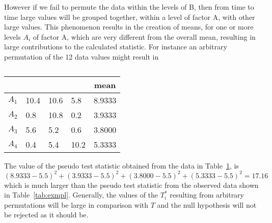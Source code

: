 \documentclass[12pt]{article}
\begin{document}
However if we fail to permute the data within the levels of B,
then from time to time large values will be grouped together, within
a level of factor A, with other large values.  This phenomenon
results in the creation of means, for one or more levels $A_i$ of
factor A, which are very different from the overall mean, resulting
in large contributions to the calculated statistic.  For instance
an arbitrary permutation of the 12 data values might result in
\begin{table}[H]
\caption{\label{tab:arbperm}}
\begin{center}
\begin{tabular}{|l|l|l|l|l|} \hline
\multicolumn{4}{|c}{} & \multicolumn{1}{|c|}{mean} \\ \hline
$A_1$ & 10.4 & 10.6 &  5.8 & 8.9333 \\ \hline
$A_2$ &  0.8 & 10.8 &  0.2 & 3.9333 \\ \hline
$A_3$ &  5.6 &  5.2 &  0.6 & 3.8000 \\ \hline
$A_4$ &  0.4 &  5.4 & 10.2 & 5.3333 \\ \hline
\end{tabular}
\end{center}
\end{table}
The value of the pseudo test statistic obtained from the
data in Table~\ref{tab:arbperm}, is
\[
(8.9333 - 5.5)^2 + (3.9333 - 5.5)^2 + (3.8000 - 5.5)^2 + (5.3333 - 5.5)^2
= 17.16
\]
which is much larger than the pseudo test statistic from the observed
data shown in Table~\ref{tab:exmpl}.  Generally, the values of
the $T_i^*$ resulting from arbitrary permutations will be large in
comparison with $T$ and the null hypothesis will not be rejected
as it should be.
\end{document}
